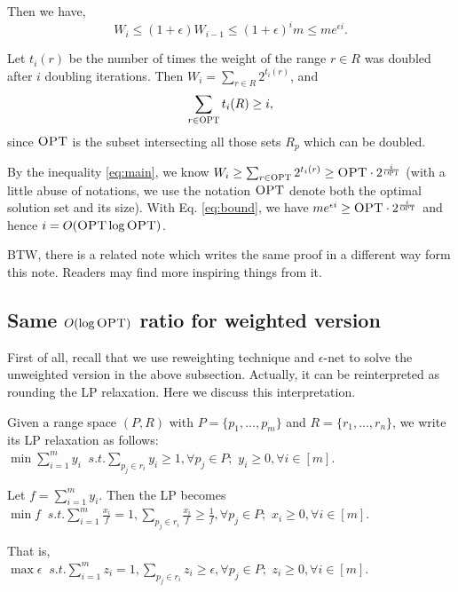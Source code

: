 \documentclass[11pt]{article}
\newcommand{\opt}{\textrm{\sc OPT}}
\renewcommand{\R}{\mathcal{R}}
\begin{document}
Then we have, 
\begin{equation}\label{eq:bound}
W_i\leq (1+\epsilon)W_{i-1}\leq (1+\epsilon)^im\leq m e^{\epsilon i}.
\end{equation}

Let $t_i(r)$ be the number of times the weight of the  range $r\in R$ was doubled after $i$ doubling iterations.
Then $W_i=\sum_{r\in R} 2^{t_i(r)}$, and \begin{equation}\label{eq:main}
\sum_{r\in \opt} t_i(R)\geq i,
\end{equation} since $\opt$ is the subset intersecting all those sets $R_p$
	which can be doubled. 

By the inequality \eqref{eq:main}, we know $W_i\geq \sum_{r\in \opt} 2^{t_i(r)}\geq \opt \cdot 2^{\frac{i}{\opt}}$ (with a little abuse
	of notations, we use the notation $\opt$ denote both the optimal solution set and its size).
With Eq. \eqref{eq:bound}, we have $m e^{\epsilon i}\geq \opt \cdot 2^{\frac{i}{\opt}}$ and hence $i=O(\opt\log \opt)$.


\renewcommand{\.}{,\ldots,}
BTW, there is a related note \cite{GeometricSetCover} which writes the same proof in a different way form this note. 
Readers may find more inspiring things from it.  

\subsection{Same $O(\log \opt)$ ratio for weighted version }
First of all, recall that we use reweighting technique and $\epsilon$-net to solve the unweighted version in the above subsection.
Actually, it can be reinterpreted as rounding the LP relaxation. Here we discuss this interpretation. 

Given a range space $(P,R)$ with $P=\{p_1\.p_m\}$ and $R=\{r_1\.r_n\}$,
	 we write its LP relaxation  as follows: \\
	 $\min \sum_{i=1}^{m} y_i~$ $s.t. \sum_{p_j\in r_i} y_i\geq 1, \forall p_j\in P;$
$y_i\geq 0,\forall i\in [m].$

Let $f=\sum_{i=1}^{m} y_i$. Then the LP becomes\\
$\min f~$ $s.t. \sum_{i=1}^{m} \frac{x_i}{f}= 1, \sum_{p_j\in r_i} \frac{x_i}{f}\geq \frac{1}{f}, \forall p_j\in P;$
$x_i\geq 0,\forall i\in [m].$

That is,\\ $\max \epsilon~$ $s.t. \sum_{i=1}^{m} z_i= 1, \sum_{p_j\in r_i} z_i\geq \epsilon, \forall p_j\in P;$
$z_i\geq 0,\forall i\in [m].$
\end{document}

